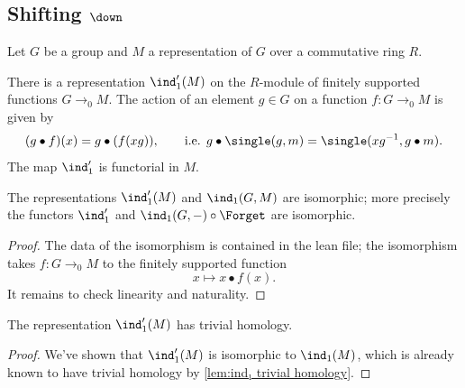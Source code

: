 \subsection{Shifting \texorpdfstring{$\down$}{down}}
Let $G$ be a group and $M$ a representation of $G$ over a commutative ring $R$.

\begin{definition} \label{def:ind'}
	\leanok
	There is a representation $\ind_1' (M)$ on the $R$-module of finitely supported
	functions $G \to_0 M$.
	The action of an element $g \in G$ on a function $f : G \to_0 M$ is given by
	\[
		(g \bullet f)(x) = g \bullet (f (xg)),\qquad
		\text{i.e. }
		g \bullet \single(g,m) = \single(xg^{-1}, g\bullet m).
 	\]
	The map $\ind_1'$ is functorial in $M$.
\end{definition}

\begin{lemma}	\label{lem:ind₁' iso ind₁}
	\leanok
	The representations $\ind_1'(M)$ and $\ind_1(G,M)$ are isomorphic; more precisely the
	functors $\ind_1'$ and $\ind_1(G,-) \circ \Forget$ are isomorphic.
\end{lemma}

\begin{proof}
	\leanok
	The data of the isomorphism is contained in the lean file; the isomorphism
	takes $f : G \to_0 M$ to the finitely supported function
	\[
		x \mapsto x \bullet f(x).
	\]
	It remains to check linearity and naturality.
\end{proof}

\begin{corollary}	\label{cor:ind₁' trivial homology}
	\leanok
	The representation $\ind_1'(M)$ has trivial homology.
\end{corollary}

\begin{proof}
	\leanok
	We've shown that $\ind_1'(M)$ is isomorphic to $\ind_1(M)$, which is already known to
	have trivial homology by \ref{lem:ind₁ trivial homology}.
\end{proof}


